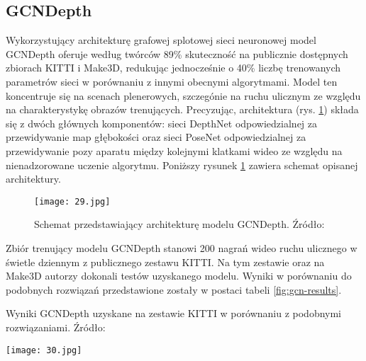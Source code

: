 \subsection{GCNDepth}
Wykorzystujący architekturę grafowej splotowej sieci neuronowej \cite{GNNBook2022} model GCNDepth \cite{masoumian2021gcndepth} oferuje według twórców 89\% skuteczność na publicznie dostępnych zbiorach KITTI i Make3D, redukując jednocześnie o 40\% liczbę trenowanych parametrów sieci w porównaniu z innymi obecnymi algorytmami. Model ten koncentruje się na scenach plenerowych, szczegónie na ruchu ulicznym ze względu na charakterystykę obrazów trenujących. Precyzując, architektura (rys. \ref{fig:gcn-schema}) składa się z dwóch głównych komponentów: sieci DepthNet odpowiedzialnej za przewidywanie map głębokości oraz sieci PoseNet odpowiedzialnej za przewidywanie pozy aparatu między kolejnymi klatkami wideo ze względu na nienadzorowane uczenie algorytmu. Poniższy rysunek \ref{fig:gcn-schema} zawiera schemat opisanej architektury.
\begin{figure}[H]
    \centering
    \texttt{[image: 29.jpg]}
    \caption{Schemat przedstawiający architekturę modelu GCNDepth. Źródło: \cite{GNNBook2022}}
    \label{fig:gcn-schema}
\end{figure}
Zbiór trenujący modelu GCNDepth stanowi 200 nagrań wideo ruchu ulicznego w świetle dziennym z publicznego zestawu KITTI. Na tym zestawie oraz na Make3D autorzy dokonali testów uzyskanego modelu. Wyniki w porównaniu do podobnych rozwiązań przedstawione zostały w postaci tabeli \ref{fig:gcn-results}.
\begin{table}[H]
    \centering
    \caption{Wyniki GCNDepth uzyskane na zestawie KITTI w porównaniu z podobnymi rozwiązaniami. Źródło: \cite{GNNBook2022}}
    \texttt{[image: 30.jpg]}
    \label{fig:gcn-results}
\end{table}


